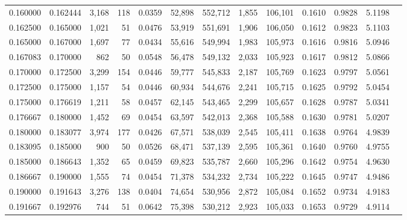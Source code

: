 \begin{tabular}{rrrrrrrrrrrrr}
0.160000 & 0.162444 & 3,168 & 118 &                                     0.0359 &  52,898 & 552,712 &   1,855 & 106,101 & 0.1610 & 0.9828 & 5.1198 \\
0.162500 & 0.165000 & 1,021 &  51 &                                     0.0476 &  53,919 & 551,691 &   1,906 & 106,050 & 0.1612 & 0.9823 & 5.1103 \\
0.165000 & 0.167000 & 1,697 &  77 &                                     0.0434 &  55,616 & 549,994 &   1,983 & 105,973 & 0.1616 & 0.9816 & 5.0946 \\
0.167083 & 0.170000 &   862 &  50 &                                     0.0548 &  56,478 & 549,132 &   2,033 & 105,923 & 0.1617 & 0.9812 & 5.0866 \\
0.170000 & 0.172500 & 3,299 & 154 &                                     0.0446 &  59,777 & 545,833 &   2,187 & 105,769 & 0.1623 & 0.9797 & 5.0561 \\
0.172500 & 0.175000 & 1,157 &  54 &                                     0.0446 &  60,934 & 544,676 &   2,241 & 105,715 & 0.1625 & 0.9792 & 5.0454 \\
0.175000 & 0.176619 & 1,211 &  58 &                                     0.0457 &  62,145 & 543,465 &   2,299 & 105,657 & 0.1628 & 0.9787 & 5.0341 \\
0.176667 & 0.180000 & 1,452 &  69 &                                     0.0454 &  63,597 & 542,013 &   2,368 & 105,588 & 0.1630 & 0.9781 & 5.0207 \\
0.180000 & 0.183077 & 3,974 & 177 &                                     0.0426 &  67,571 & 538,039 &   2,545 & 105,411 & 0.1638 & 0.9764 & 4.9839 \\
0.183095 & 0.185000 &   900 &  50 &                                     0.0526 &  68,471 & 537,139 &   2,595 & 105,361 & 0.1640 & 0.9760 & 4.9755 \\
0.185000 & 0.186643 & 1,352 &  65 &                                     0.0459 &  69,823 & 535,787 &   2,660 & 105,296 & 0.1642 & 0.9754 & 4.9630 \\
0.186667 & 0.190000 & 1,555 &  74 &                                     0.0454 &  71,378 & 534,232 &   2,734 & 105,222 & 0.1645 & 0.9747 & 4.9486 \\
0.190000 & 0.191643 & 3,276 & 138 &                                     0.0404 &  74,654 & 530,956 &   2,872 & 105,084 & 0.1652 & 0.9734 & 4.9183 \\
0.191667 & 0.192976 &   744 &  51 &                                     0.0642 &  75,398 & 530,212 &   2,923 & 105,033 & 0.1653 & 0.9729 & 4.9114 \\

\end{tabular}
